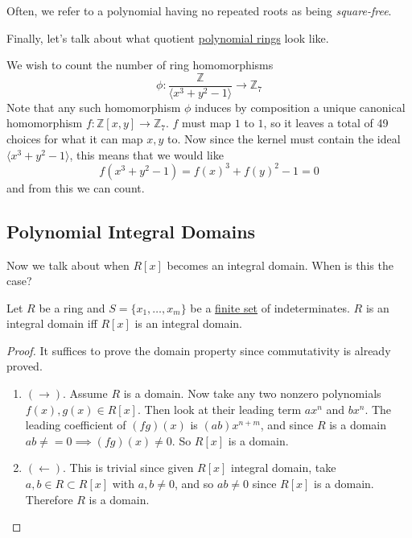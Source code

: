  Often, we refer to a polynomial having no repeated roots as being \textit{square-free}. 

  Finally, let's talk about what quotient \hyperref[def:polynomial-ring]{polynomial rings} look like. 

  \begin{example}
    \label{ex:counting-ring-homomorphisms}
    We wish to count the number of ring homomorphisms 
    \begin{equation}
      \phi: \frac{\mathbb{Z}}{\langle x^3 + y^2 - 1 \rangle} \to \mathbb{Z}_7
    \end{equation}
    Note that any such homomorphism $\phi$ induces by composition a unique canonical homomorphism $f: \mathbb{Z}[x, y] \to \mathbb{Z}_7$. $f$ must map $1$ to $1$, so it leaves a total of 49 choices for what it can map $x, y$ to. Now since the kernel must contain the ideal $\langle x^3 + y^2 - 1 \rangle$, this means that we would like 
    \begin{equation}
      f(x^3 + y^2 - 1) = f(x)^3 + f(y)^2 - 1 = 0
    \end{equation}
    and from this we can count. 
  \end{example}

\subsection{Polynomial Integral Domains}

  Now we talk about when $R[x]$ becomes an integral domain. When is this the case? 

  \begin{theorem}
    \label{thm:conditions-for-rlbrackxrbrack-to-be-integral}
    Let $R$ be a ring and $S = \{x_1, \ldots, x_m\}$ be a \hyperref[st-def:finite-set]{finite set} of indeterminates. $R$ is an integral domain iff $R[x]$ is an integral domain. 
  \end{theorem}
  \begin{proof}
    It suffices to prove the domain property since commutativity is already proved. 
    \begin{enumerate}
      \item $(\rightarrow)$. Assume $R$ is a domain. Now take any two nonzero polynomials $f(x), g(x) \in R[x]$. Then look at their leading term $ax^n$ and $bx^n$. The leading coefficient of $(fg)(x)$ is $(ab) x^{n+m}$, and since $R$ is a domain $ab \neq = 0 \implies (fg)(x) \neq 0$. So $R[x]$ is a domain. 
      \item $(\leftarrow)$. This is trivial since given $R[x]$ integral domain, take $a, b \in R \subset R[x]$ with $a, b \neq 0$, and so $ab \neq 0$ since $R[x]$ is a domain. Therefore $R$ is a domain. 
    \end{enumerate}
  \end{proof}

